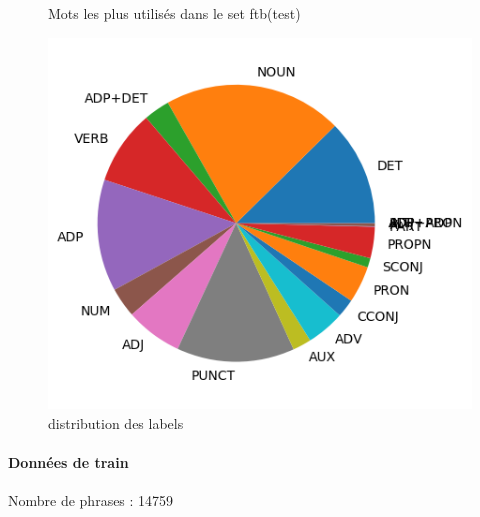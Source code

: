 \begin{figure}[H]
\begin{minipage}{0.48\textwidth}
\begin{tabular}{|l || *{11 }{|c} |}
\end{tabular}
\caption{ Mots les plus utilisés dans le set ftb(test) } \label{Fig:muw}\end{minipage} 
\begin{minipage}{0.48\textwidth} \centering
\includegraphics[width=.7\linewidth]{ftbtest_img.png}
\caption{distribution des labels}
\end{minipage}
\end{figure} \paragraph{Données de train \\ }  
 Nombre de phrases : 14759\\ 
